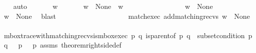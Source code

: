 \begin{isabellebody}
{}\isanewline
\ \ \isamarkupfalse%
\ auto\ %
\isanewline
\ \ \ \ \isamarkupfalse%
\ w\ \isanewline
\ \ \ \ \isamarkupfalse%
\ {\isachardoublequoteopen}w\ {\isasymin}\ {\isasymT}\isactrlbsub None\isactrlesub \ {\isasymLongrightarrow}\ w{\isasymdown}\isactrlsub {\isacharbang}{\kern0pt}\ {\isasymin}\ {\isasymL}\isactrlsub {\isasymzero}{\isachardoublequoteclose}\ \isanewline
\ \ \ \ \isamarkupfalse%
\ {\isacharminus}{\kern0pt}\isanewline
\ \ \ \ \ \ \isamarkupfalse%
\ {\isachardoublequoteopen}w\ {\isasymin}\ {\isasymT}\isactrlbsub None\isactrlesub {\isachardoublequoteclose}\ \isanewline
\ \ \ \ \ \ \isamarkupfalse%
\ \isamarkupfalse%
\ {\isachardoublequoteopen}{\isacharparenleft}{\kern0pt}w{\isasymdown}\isactrlsub {\isacharbang}{\kern0pt}{\isacharparenright}{\kern0pt}\ {\isasymin}\ {\isasymT}\isactrlbsub None\isactrlesub {\isasymdownharpoonright}\isactrlsub {\isacharbang}{\kern0pt}{\isachardoublequoteclose}\ \isamarkupfalse%
\ blast\isanewline
\ \ \ \ \ \ \ \ \ \ \isanewline
\ \ \ \ \ \ \isamarkupfalse%
\ \isamarkupfalse%
\ match{\isacharunderscore}{\kern0pt}exec{\isacharcolon}{\kern0pt}\ {\isachardoublequoteopen}add{\isacharunderscore}{\kern0pt}matching{\isacharunderscore}{\kern0pt}recvs\ {\isacharparenleft}{\kern0pt}w{\isasymdown}\isactrlsub {\isacharbang}{\kern0pt}{\isacharparenright}{\kern0pt}\ {\isasymin}\ {\isasymT}\isactrlbsub None\isactrlesub {\isachardoublequoteclose}\isanewline
\ \ \ \ \ \ \ \ \isamarkupfalse%
\ mbox{\isacharunderscore}{\kern0pt}trace{\isacharunderscore}{\kern0pt}with{\isacharunderscore}{\kern0pt}matching{\isacharunderscore}{\kern0pt}recvs{\isacharunderscore}{\kern0pt}is{\isacharunderscore}{\kern0pt}mbox{\isacharunderscore}{\kern0pt}exec\ {\isacartoucheopen}{\isasymforall}p{\isasymin}{\isasymP}{\isachardot}{\kern0pt}\ {\isasymforall}q{\isasymin}{\isasymP}{\isachardot}{\kern0pt}\ is{\isacharunderscore}{\kern0pt}parent{\isacharunderscore}{\kern0pt}of\ p\ q\ {\isasymlongrightarrow}\ subset{\isacharunderscore}{\kern0pt}condition\ p\ q\ {\isasymand}\ {\isasymL}\isactrlsup {\isacharasterisk}{\kern0pt}\ p\ {\isacharequal}{\kern0pt}\ {\isasymL}\isactrlsup {\isacharasterisk}{\kern0pt}\isactrlsub {\isasymsqunion}\isactrlsub {\isasymsqunion}\ p{\isacartoucheclose}\ assms\ theorem{\isacharunderscore}{\kern0pt}rightside{\isacharunderscore}{\kern0pt}def\isanewline
\ \ \ \ \ \ \ \ \isamarkupfalse%

\end{isabellebody}

